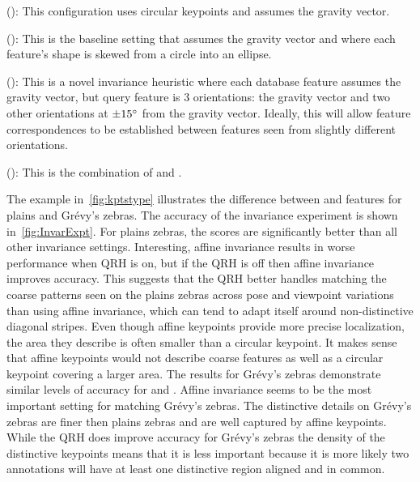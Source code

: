         \FloatBarrier{}
        \begin{itemln}

            \item \NoInvar{} (): %
                This configuration uses circular keypoints and assumes the gravity vector.

            \item \AIAlone{} (): %
                This is the baseline setting that assumes the gravity vector and where each feature's shape is skewed
                  from a circle into an ellipse.

            \item \QRHCirc{} (): %
                This is a novel invariance heuristic where each {database} feature assumes the gravity vector, but
                  {query} feature is $3$ orientations:
                the gravity vector and two other orientations at $\pm15^{\circ}$ from the gravity vector.
                Ideally, this will allow feature correspondences to be established between features seen from
                  slightly different orientations.

            \item \QRHEll{} (): %
                This is the combination of \QRHCirc{} and \AIAlone{}.

        \end{itemln}
        \FloatBarrier{}

        The example in~\cref{fig:kptstype} illustrates the difference between \AIAlone{} and \QRHCirc{} features
        for plains and Grévy's zebras. The accuracy of the invariance experiment is shown in~\cref{fig:InvarExpt}.
        For plains zebras, the \QRHCirc{} scores are significantly better than all other invariance settings.
        Interesting, affine invariance results in worse performance when QRH is on, but if the QRH is off then
        affine invariance improves accuracy. This suggests that the QRH better handles matching the coarse patterns
        seen on the plains zebras across pose and viewpoint variations than using affine invariance, which can tend
        to adapt itself around non-distinctive diagonal stripes. Even though affine keypoints provide more precise
        localization, the area they describe is often smaller than a circular keypoint. It makes sense that affine
        keypoints would not describe coarse features as well as a circular keypoint covering a larger area.
        The results for Grévy's zebras demonstrate similar levels of accuracy for \AIAlone{} and \QRHEll{}. Affine
        invariance seems to be the most important setting for matching Grévy's zebras. The distinctive details on
        Grévy's zebras are finer then plains zebras and are well captured by affine keypoints. While the QRH does
        improve accuracy for Grévy's zebras the density of the distinctive keypoints means that it is less
        important because it is more likely two annotations will have at least one distinctive region aligned and
        in common.

